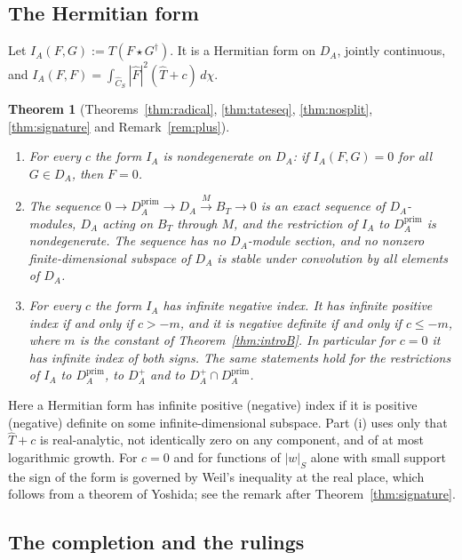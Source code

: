 \documentclass[11pt]{amsart}
\newtheorem{theorem}{Theorem}[section]
\theoremstyle{definition}
\theoremstyle{remark}
\begin{document}
\subsection*{The Hermitian form}

Let $I_A(F,G):=T(F\star G^{\dagger})$.  It is a Hermitian form on $D_A$,
jointly continuous, and
$I_A(F,F)=\int_{\widehat C_S}|\widehat F|^{2}(\widehat T+c)\,d\chi$.

\begin{theorem}[Theorems~\ref{thm:radical}, \ref{thm:tateseq},
\ref{thm:nosplit}, \ref{thm:signature} and Remark~\ref{rem:plus}]\label{thm:introC}
\begin{enumerate}
\item[(i)] For every $c$ the form $I_A$ is nondegenerate on $D_A$: if
$I_A(F,G)=0$ for all $G\in D_A$, then $F=0$.
\item[(ii)] The sequence
$0\to D_A^{\mathrm{prim}}\to D_A\stackrel{M}{\to}B_T\to0$ is an exact sequence
of $D_A$-modules, $D_A$ acting on $B_T$ through $M$, and the restriction of
$I_A$ to $D_A^{\mathrm{prim}}$ is nondegenerate.  The sequence has no
$D_A$-module section, and no nonzero finite-dimensional subspace of $D_A$ is
stable under convolution by all elements of $D_A$.
\item[(iii)] For every $c$ the form $I_A$ has infinite negative index.  It has
infinite positive index if and only if $c>-m$, and it is negative definite if
and only if $c\le-m$, where $m$ is the constant of
Theorem~\ref{thm:introB}.  In particular for $c=0$ it has infinite index of
both signs.  The same statements hold for the restrictions of $I_A$ to
$D_A^{\mathrm{prim}}$, to $D_A^{+}$ and to $D_A^{+}\cap D_A^{\mathrm{prim}}$.
\end{enumerate}
\end{theorem}

Here a Hermitian form has infinite positive (negative) index if it is
positive (negative) definite on some infinite-dimensional subspace.  Part (i)
uses only that $\widehat T+c$ is real-analytic, not identically zero on any
component, and of at most logarithmic growth.  For $c=0$ and for functions of
$|w|_S$ alone with small support the sign of the form is governed by Weil's
inequality at the real place, which follows from a theorem of Yoshida; see
the remark after
Theorem~\ref{thm:signature}.

\subsection*{The completion and the rulings}
\end{document}

